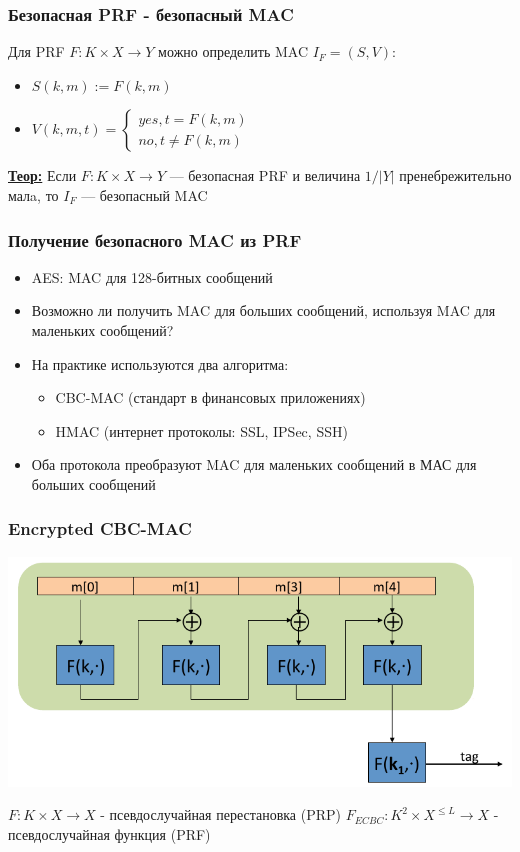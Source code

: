 \documentclass{beamer}
\newcommand{\theorema}[1]{{\textbf{\underline{Теор:}} #1}}
\begin{document}
\begin{frame}
  \frametitle{Безопасная PRF - безопасный MAC}

  Для PRF $F: K \times X \rightarrow Y$ можно определить MAC $I_{F}=(S,V)$:

  \begin{itemize}
    \item{$S(k,m) := F(k,m)$}
    \item{$V(k,m,t) = \left\{
        \begin{array}{l} 
          yes, t=F(k,m) \\
          no, t \neq F(k,m)
        \end{array}
      \right.$}
  \end{itemize}

  \theorema{Если $F: K \times X \rightarrow Y$ --- безопасная PRF и 
    величина $1/|Y|$ пренебрежительно малa, то $I_{F}$ --- безопасный MAC}

\end{frame}


\begin{frame}
  \frametitle{Получение безопасного MAC из PRF}

  \begin{itemize}
    \item{AES: MAC для 128-битных сообщений}
    \item{Возможно ли получить MAC для больших сообщений, используя MAC для маленьких сообщений?}
    \item{На практике используются два алгоритма:
      \begin{itemize}
        \item{CBC-MAC (стандарт в финансовых приложениях)}
        \item{HMAC (интернет протоколы: SSL, IPSec, SSH)}
      \end{itemize}
    }
    \item{Оба протокола преобразуют MAC для маленьких сообщений в МАС для больших сообщений}
  \end{itemize}
\end{frame}


\begin{frame}
  \frametitle{Encrypted CBC-MAC}

  \includegraphics[width=\linewidth]{./images/png/ECBC_MAC.png}

  $F:K \times X \rightarrow X$ - псевдослучайная перестановка (PRP)
  $F_{ECBC}:K^{2} \times X^{\le L} \rightarrow X$ - псевдослучайная функция (PRF)

\end{frame}
\end{document}
